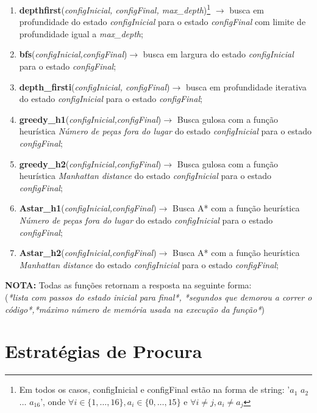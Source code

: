 \documentclass{article}
\begin{document}
\begin{enumerate}
  \itemsep0mm
  \item{\textbf{depthfirst}(\textit{configInicial, configFinal, max\_depth})\footnote{Em todos os casos, configInicial e configFinal estão na forma de string: '$a_1$ $a_2$ $\hdots$ $a_{16}$', onde $\forall i \in \{1,\hdots,16\}, a_i \in\{0,\hdots,15\}$ e $\forall{i\neq j},a_i\neq a_j$} $\rightarrow$ busca em profundidade do estado \textit{configInicial} para o estado \textit{configFinal} com limite de profundidade igual a \textit{max\_depth};}
  \item{\textbf{bfs}(\textit{configInicial,configFinal})$\rightarrow$ busca em largura do estado \textit{configInicial} para o estado \textit{configFinal};}
  \item{\textbf{depth\_firsti}(\textit{configInicial, configFinal})$\rightarrow$ busca em profundidade iterativa do estado \textit{configInicial} para o estado \textit{configFinal};}
  \item{\textbf{greedy\_h1}(\textit{configInicial,configFinal})$\rightarrow$ Busca gulosa com a função heurística \textit{Número de peças fora do lugar} do estado \textit{configInicial} para o estado \textit{configFinal};}
  \item{\textbf{greedy\_h2}(\textit{configInicial,configFinal})$\rightarrow$ Busca gulosa com a função heurística \textit{Manhattan distance} do estado \textit{configInicial} para o estado \textit{configFinal};}
  \item{\textbf{Astar\_h1}(\textit{configInicial,configFinal})$\rightarrow$ Busca A* com a função heurística \textit{Número de peças fora do lugar} do estado \textit{configInicial} para o estado \textit{configFinal};}
  \item{\textbf{Astar\_h2}(\textit{configInicial,configFinal})$\rightarrow$ Busca A* com a função heurística \textit{Manhattan distance} do estado \textit{configInicial} para o estado \textit{configFinal};}
\end{enumerate}
\textbf{NOTA:} Todas as funções retornam a resposta na seguinte forma: \\ (\textit{*lista com passos do estado inicial para final*, *segundos que demorou a correr o código*,*máximo número de memória usada na execução da função*})

\newpage
\section{Estratégias de Procura}
\end{document}
